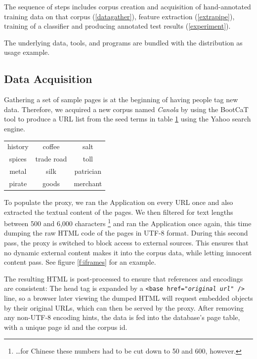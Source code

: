 The sequence of steps includes
corpus creation and acquisition of hand-annotated training data on that corpus (\ref{datagather}), 
feature extraction (\ref{extrapipe}), 
training of a classifier and producing annotated test results (\ref{experiment}).

The underlying data, tools, and programs are bundled with the {\KrdWrd} distribution as usage example.


\subsection{Data Acquisition\label{datagather}}

Gathering a set of sample pages is at the beginning of having people tag new data.
Therefore, we acquired a new corpus named \textit{Canola} by using the BootCaT \cite{bootcat} tool to produce a URL list from the seed terms in table \ref{t:seed} using the Yahoo search engine. 

\begin{table}
\centering
{}
\begin{tabular}[h]{ccc}
        history
&        coffee 
&        salt \\
        spices 
&        trade road
&        toll \\
        metal
&        silk 
&        patrician \\
        pirate 
&        goods
&        merchant 
\end{tabular}
\label{t:seed}
\end{table}

To populate the proxy, we ran the Application on every URL once and also extracted the textual content of the pages.
We then filtered for text lengths between 500 and 6,000 characters \footnote{\ldots for Chinese these numbers had to be cut down to 50 and 600, however.} and ran the Application once again, this time dumping the raw HTML code of the pages in UTF-8 format.
During this second pass, the proxy is switched to block access to external sources.
This ensures that no dynamic external content makes it into the corpus data, while letting innocent content pass.
See figure \ref{f:iframes} for an example.

The resulting HTML is post-processed to ensure that references and encodings are consistent:
The head tag is expanded by a \texttt{<base href="\textit{original url}" />} line, so a browser later viewing the dumped HTML will request embedded objects by their original URLs, which can then be served by the proxy.
After removing any non-UTF-8 encoding hints, the data is fed into the database's page table, with a unique page id and the corpus id.

